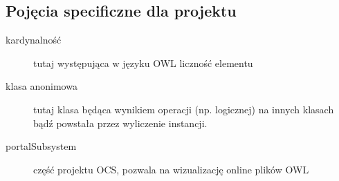 \subsection{Pojęcia specificzne dla projektu}
\begin{description}
 	\item[kardynalność] tutaj występująca w języku OWL liczność elementu
	\item[klasa anonimowa] tutaj klasa będąca wynikiem operacji (np. logicznej) na innych klasach bądź powstała przez wyliczenie instancji.
 	\item[portalSubsystem] część projektu OCS, pozwala na wizualizację online plików OWL
\end{description}

